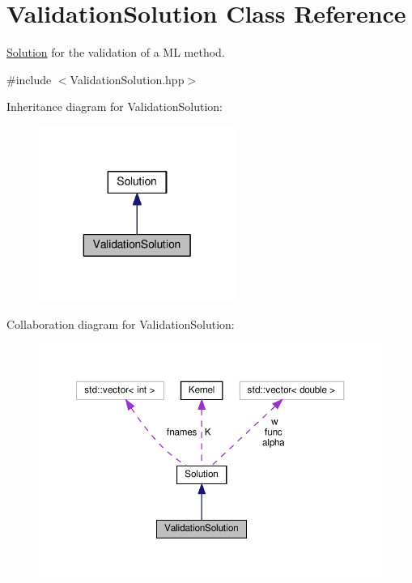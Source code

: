 \hypertarget{class_validation_solution}{}\section{Validation\+Solution Class Reference}
\label{class_validation_solution}


\hyperlink{class_solution}{Solution} for the validation of a ML method.  




{\ttfamily \#include $<$Validation\+Solution.\+hpp$>$}



Inheritance diagram for Validation\+Solution\+:
\nopagebreak
\begin{figure}[H]
\begin{center}
\leavevmode
\includegraphics[width=182pt]{class_validation_solution__inherit__graph}
\end{center}
\end{figure}


Collaboration diagram for Validation\+Solution\+:
\nopagebreak
\begin{figure}[H]
\begin{center}
\leavevmode
\includegraphics[width=350pt]{class_validation_solution__coll__graph}
\end{center}
\end{figure}
